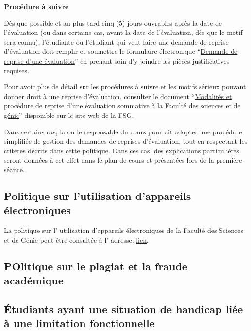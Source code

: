 \documentclass[
  french,
  letterpaper,
  DIV=11,
  numbers=noendperiod]{scrartcl}
\begin{document}
\textbf{Procédure à suivre}

Dès que possible et au plus tard cinq (5) jours ouvrables après la date
de l'évaluation (ou dans certains cas, avant la date de l'évaluation,
dès que le motif sera connu), l'étudiante ou l'étudiant qui veut faire
une demande de reprise d'évaluation doit remplir et soumettre le
formulaire électronique
``\href{https://ulavaldti.sharepoint.com/sites/FSG-reprise-dexamens-et-reconnaissance-de-cours/Lists/Demande\%20de\%20reprise\%20dexamens/NewForm.aspx?Source=https\%3A\%2F\%2Fulavaldti.sharepoint.com\%2Fsites\%2Ffsg-demande-de-reprise-examen\%2FLists\%2FDemande\%2520de\%2520reprise\%2520dexamens\%2FEtudiant.aspx\%3FCT\%3D1724436857013\%26OR\%3DOWA\%252DNT\%252DMail\%26CID\%3D42d5014c\%252D8fb5\%252D8232\%252Dbd8f\%252D69c67e3a9cdd&ContentTypeId=0x010020B04CCB63D0044D860D6BB7B9C92629007488899A2536D44DA71B9101B9C72D92&RootFolder=}{Demande
de reprise d'une évaluation}'' en prenant soin d'y joindre les pièces
justificatives requises.

Pour avoir plus de détail sur les procédures à suivre et les motifs
sérieux pouvant donner droit à une reprise d'évaluation, consulter le
document
``\href{https://www.fsg.ulaval.ca/fileadmin/site_facultaire/Espace_facultaire/Étudiants/Politiques_facultaires/Modalités_reprise_évaluation_FSG_A24.pdf}{Modalités
et procédure de reprise d'une évaluation sommative à la Faculté des
sciences et de génie}'' disponible sur le site web de la FSG.

Dans certains cas, la ou le responsable du cours pourrait adopter une
procédure simplifiée de gestion des demandes de reprises d'évaluation,
tout en respectant les critères décrits dans cette politique. Dans ces
cas, des explications particulières seront données à cet effet dans le
plan de cours et présentées lors de la première séance.

\subsection{Politique sur l'utilisation d'appareils
électroniques}\label{politique-sur-lutilisation-dappareils-uxe9lectroniques}

La politique sur l' utilisation d'appareils électroniques de la Faculté
des Sciences et de Génie peut être consultée à l' adresse:
\href{https://www.fsg.ulaval.ca/fileadmin/site_facultaire/Espace_facultaire/Étudiants/Politiques_facultaires/_Calculatrices-autorisées-FSG_20250221.pdf}{lien}.

\subsection{POlitique sur le plagiat et la fraude
académique}\label{politique-sur-le-plagiat-et-la-fraude-acaduxe9mique}

\subsection{Étudiants ayant une situation de handicap liée à une
limitation
fonctionnelle}\label{uxe9tudiants-ayant-une-situation-de-handicap-liuxe9e-uxe0-une-limitation-fonctionnelle}
\end{document}
